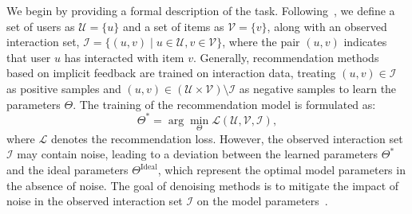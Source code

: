 

We begin by providing a formal description of the task. Following~\cite{he2020lightgcn, he2024double}, we define a set of users as $\mathcal{U} = \{u\}$ and a set of items as $\mathcal{V} = \{v\}$, along with an observed interaction set, $\mathcal{I} = \{(u, v) \mid u \in \mathcal{U}, v \in \mathcal{V}\}$, where the pair \((u, v)\) indicates that user \(u\) has interacted with item \(v\). Generally, recommendation methods based on implicit feedback are trained on interaction data, treating \((u, v) \in \mathcal{I}\) as positive samples and \((u, v) \in (\mathcal{U} \times \mathcal{V}) \setminus \mathcal{I}\) as negative samples to learn the parameters \(\Theta\). The training of the recommendation model is formulated as:
\begin{equation*}
    \Theta^{*} = \arg\min_{\Theta} \mathcal{L}(\mathcal{U},\mathcal{V},\mathcal{I}),
\end{equation*}
where \(\mathcal{L}\) denotes the recommendation loss. However, the observed interaction set \(\mathcal{I}\) may contain noise, leading to a deviation between the learned parameters \(\Theta^{*}\) and the ideal parameters \(\Theta^{\mathrm{Ideal}}\), which represent the optimal model parameters in the absence of noise. The goal of denoising methods is to mitigate the impact of noise in the observed interaction set \(\mathcal{I}\) on the model parameters~\cite{zhang2023robust, zhao2024denoising, yu2020sampler}. 


